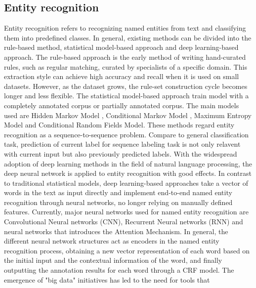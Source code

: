 \documentclass[%
 aip,
 jmp,%
 amsmath,amssymb,
 reprint,%
]{revtex4-2}
\begin{document}
\subsection{Entity recognition}
Entity recognition refers to recognizing named entities from text and classifying them into predefined classes.
In general, existing methods can be divided into the rule-based method, statistical model-based approach and 
deep learning-based approach.
The rule-based approach is the early method of writing hand-curated rules, such as regular matching, curated 
by specialists of a specific domain. This extraction style can achieve
high accuracy and recall when it is used on small datasets. However, as the dataset grows, 
the rule-set construction cycle becomes longer and less flexible.
The statistical model-based approach train model with a completely annotated corpus or partially annotated corpus.
The main models used are Hidden Markov Model \cite{fine1998hierarchical}, Conditional Markov Model \cite{cook2004conditional}, 
Maximum Entropy Model \cite{ratnaparkhi1996maximum} and Conditional Random Fields Model\cite{wallach2004conditional}. 
These methods regard entity recognition as a sequence-to-sequence problem.
Compare to general classification task, prediction of current label for sequence labeling task 
is not only relavent with current input but also previously predicted labels.  
With the widespread adoption of deep learning methods in the field 
of natural language processing, the deep neural network is applied to 
entity recognition with good effects. In contrast to traditional 
statistical models, deep learning-based approaches take a vector of words in the text as input directly and implement end-to-end named entity recognition through neural networks, no longer relying on manually defined features.
Currently, major neural networks used for named entity
recognition are Convolutional Neural networks (CNN)\cite{o2015introduction}, 
Recurrent Neural networks (RNN) \cite{medsker2001recurrent} and neural networks 
that introduces the Attention Mechanism\cite{tilk2016bidirectional}. In general, the different
neural network structures act as encoders in the named entity 
recognition process, obtaining a new vector representation 
of each word based on the initial input and the contextual 
information of the word, and finally outputting the annotation 
results for each word through a CRF model.
The emergence of "big data" initiatives has led to the need for tools that 
\end{document}
